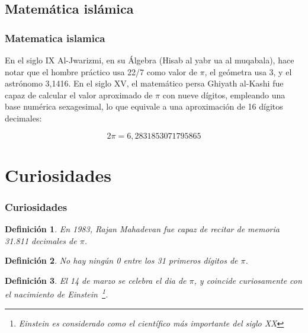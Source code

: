 \documentclass{beamer}
\newtheorem{definicion}{Definición}
\begin{document}
\subsection{Matemática islámica}

\begin {frame}
\frametitle{Matematica islamica}

En el siglo IX Al-Jwarizmi, en su Álgebra (Hisab al yabr ua al muqabala), hace notar que el hombre práctico usa 22/7 como valor de $\pi$,
el geómetra usa 3, y el astrónomo 3,1416. En el siglo XV, el matemático persa Ghiyath al-Kashi fue capaz de calcular el valor aproximado de $\pi$ con nueve dígitos,
empleando una base numérica sexagesimal, lo que equivale a una aproximación de 16 dígitos decimales:

\begin{equation}
2 \pi = 6,2831853071795865
\end{equation} 

\end {frame}

\section{Curiosidades}
 
\begin{frame}

\frametitle{Curiosidades}
\begin{definicion}
En 1983,  Rajan Mahadevan  fue capaz de recitar de memoria 31.811 decimales de $\pi$.
\end{definicion}

\begin{definicion}
No hay ningún 0 entre los 31 primeros dígitos de $\pi$.
\end{definicion}

\begin{definicion}
El 14 de marzo se celebra el dia de $\pi$, y coincide curiosamente con el nacimiento de Einstein~\footnote{Einstein es considerado como el científico más importante del siglo XX}.
\end{definicion}

\end{frame}
\end{document}
